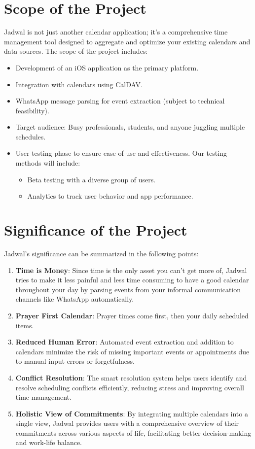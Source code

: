 \documentclass[12pt,a4paper]{report}
\begin{document}
\section{Scope of the Project}

Jadwal is not just another calendar application; it's a comprehensive time management tool designed to aggregate and optimize your existing calendars and data sources. The scope of the project includes:
\begin{itemize}
    \item Development of an iOS application as the primary platform.
    \item Integration with calendars using CalDAV.
    \item WhatsApp message parsing for event extraction (subject to technical feasibility).
    \item Target audience: Busy professionals, students, and anyone juggling multiple schedules.
    \item User testing phase to ensure ease of use and effectiveness. Our testing methods will include:
    \begin{itemize}
            \item Beta testing with a diverse group of users.
            \item Analytics to track user behavior and app performance.
        \end{itemize}
\end{itemize}


\section{Significance of the Project}

Jadwal's significance can be summarized in the following points:
\begin{enumerate}
    \item \textbf{Time is Money}: Since time is the only asset you can't get more of, Jadwal tries to make it less painful and less time consuming to have a good calendar throughout your day by parsing events from your informal communication channels like WhatsApp automatically.
    \item \textbf{Prayer First Calendar}: Prayer times come first, then your daily scheduled items.
    \item \textbf{Reduced Human Error}: Automated event extraction and addition to calendars minimize the risk of missing important events or appointments due to manual input errors or forgetfulness.
    \item \textbf{Conflict Resolution}: The smart resolution system helps users identify and resolve scheduling conflicts efficiently, reducing stress and improving overall time management.
    \item \textbf{Holistic View of Commitments}: By integrating multiple calendars into a single view, Jadwal provides users with a comprehensive overview of their commitments across various aspects of life, facilitating better decision-making and work-life balance.
\end{enumerate}
\end{document}
